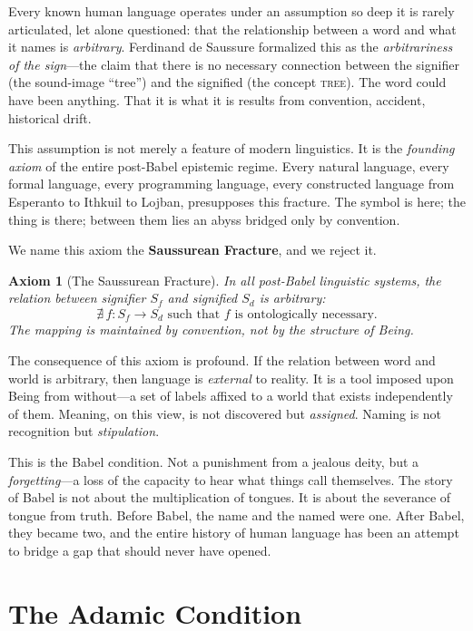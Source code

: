 \documentclass[12pt, letterpaper]{book}
\newtheorem{axiom}{Axiom}[chapter]
\begin{document}
Every known human language operates under an assumption so deep it is rarely articulated, let alone questioned: that the relationship between a word and what it names is \textit{arbitrary}. Ferdinand de Saussure formalized this as the \textit{arbitrariness of the sign}---the claim that there is no necessary connection between the signifier (the sound-image ``tree'') and the signified (the concept \textsc{tree}). The word could have been anything. That it is what it is results from convention, accident, historical drift.

This assumption is not merely a feature of modern linguistics. It is the \textit{founding axiom} of the entire post-Babel epistemic regime. Every natural language, every formal language, every programming language, every constructed language from Esperanto to Ithkuil to Lojban, presupposes this fracture. The symbol is here; the thing is there; between them lies an abyss bridged only by convention.

We name this axiom the \textbf{Saussurean Fracture}, and we reject it.

\begin{axiom}[The Saussurean Fracture]\label{ax:fracture}
In all post-Babel linguistic systems, the relation between signifier $S_f$ and signified $S_d$ is arbitrary:
\[
\nexists\, f : S_f \to S_d \text{ such that } f \text{ is ontologically necessary.}
\]
The mapping is maintained by convention, not by the structure of Being.
\end{axiom}

The consequence of this axiom is profound. If the relation between word and world is arbitrary, then language is \textit{external} to reality. It is a tool imposed upon Being from without---a set of labels affixed to a world that exists independently of them. Meaning, on this view, is not discovered but \textit{assigned}. Naming is not recognition but \textit{stipulation}.

This is the Babel condition. Not a punishment from a jealous deity, but a \textit{forgetting}---a loss of the capacity to hear what things call themselves. The story of Babel is not about the multiplication of tongues. It is about the severance of tongue from truth. Before Babel, the name and the named were one. After Babel, they became two, and the entire history of human language has been an attempt to bridge a gap that should never have opened.

\section{The Adamic Condition}
\end{document}
